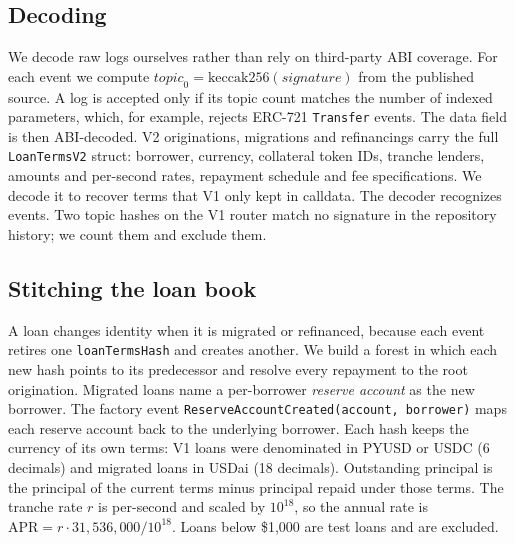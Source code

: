 \subsection{Decoding}
We decode raw logs ourselves rather than rely on third-party ABI coverage. For each event we compute $\textit{topic}_0=\mathrm{keccak256}(\textit{signature})$ from the published source. A log is accepted only if its topic count matches the number of indexed parameters, which, for example, rejects ERC-721 \texttt{Transfer} events. The data field is then ABI-decoded. V2 originations, migrations and refinancings carry the full \texttt{LoanTermsV2} struct: borrower, currency, collateral token IDs, tranche lenders, amounts and per-second rates, repayment schedule and fee specifications. We decode it to recover terms that V1 only kept in calldata. The decoder recognizes \EventsDecoded{} events. Two topic hashes on the V1 router match no signature in the repository history; we count them and exclude them.

\subsection{Stitching the loan book}
A loan changes identity when it is migrated or refinanced, because each event retires one \texttt{loanTermsHash} and creates another. We build a forest in which each new hash points to its predecessor and resolve every repayment to the root origination. Migrated loans name a per-borrower \emph{reserve account} as the new borrower. The factory event \texttt{ReserveAccountCreated(account, borrower)} maps each reserve account back to the underlying borrower. Each hash keeps the currency of its own terms: V1 loans were denominated in PYUSD or USDC (6 decimals) and migrated loans in USDai (18 decimals). Outstanding principal is the principal of the current terms minus principal repaid under those terms. The tranche rate $r$ is per-second and scaled by $10^{18}$, so the annual rate is $\mathrm{APR}=r\cdot 31{,}536{,}000/10^{18}$. Loans below \$1{,}000 are test loans and are excluded.

